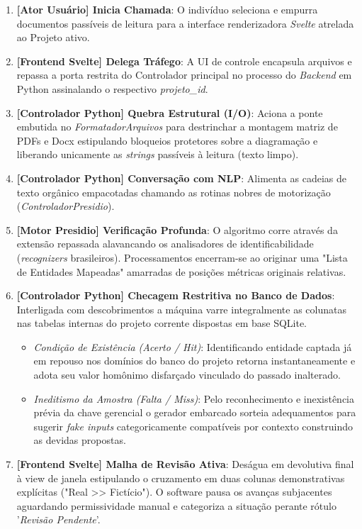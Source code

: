 \documentclass{scrreprt}
\begin{document}
\begin{enumerate}
    \item \textbf{[Ator Usuário] Inicia Chamada}: O indivíduo seleciona e empurra documentos passíveis de leitura para a interface renderizadora \textit{Svelte} atrelada ao Projeto ativo.
    \item \textbf{[Frontend Svelte] Delega Tráfego}: A UI de controle encapsula arquivos e repassa a porta restrita do Controlador principal no processo do \textit{Backend} em Python assinalando o respectivo \textit{projeto\_id}.
    \item \textbf{[Controlador Python] Quebra Estrutural (I/O)}: Aciona a ponte embutida no \textit{FormatadorArquivos} para destrinchar a montagem matriz de PDFs e Docx estipulando bloqueios protetores sobre a diagramação e liberando unicamente as \textit{strings} passíveis à leitura (texto limpo).
    \item \textbf{[Controlador Python] Conversação com NLP}: Alimenta as cadeias de texto orgânico empacotadas chamando as rotinas nobres de motorização (\textit{ControladorPresidio}).
    \item \textbf{[Motor Presidio] Verificação Profunda}: O algoritmo corre através da extensão repassada alavancando os analisadores de identificabilidade (\textit{recognizers} brasileiros). Processamentos encerram-se ao originar uma "Lista de Entidades Mapeadas" amarradas de posições métricas originais relativas.
    \item \textbf{[Controlador Python] Checagem Restritiva no Banco de Dados}: Interligada com descobrimentos a máquina varre integralmente as colunatas nas tabelas internas do projeto corrente dispostas em base SQLite.
    \begin{itemize}
        \item \textit{Condição de Existência (Acerto / Hit)}: Identificando entidade captada já em repouso nos domínios do banco do projeto retorna instantaneamente e adota seu valor homônimo disfarçado vinculado do passado inalterado.
        \item \textit{Ineditismo da Amostra (Falta / Miss)}: Pelo reconhecimento e inexistência prévia da chave gerencial o gerador embarcado sorteia adequamentos para sugerir \textit{fake inputs} categoricamente compatíveis por contexto construindo as devidas propostas.
    \end{itemize}
    \item \textbf{[Frontend Svelte] Malha de Revisão Ativa}: Deságua em devolutiva final à view de janela estipulando o cruzamento em duas colunas demonstrativas explícitas ("Real >> Fictício"). O software pausa os avanças subjacentes aguardando permissividade manual e categoriza a situação perante rótulo '\textit{Revisão Pendente}'.

\end{enumerate}
\end{document}
